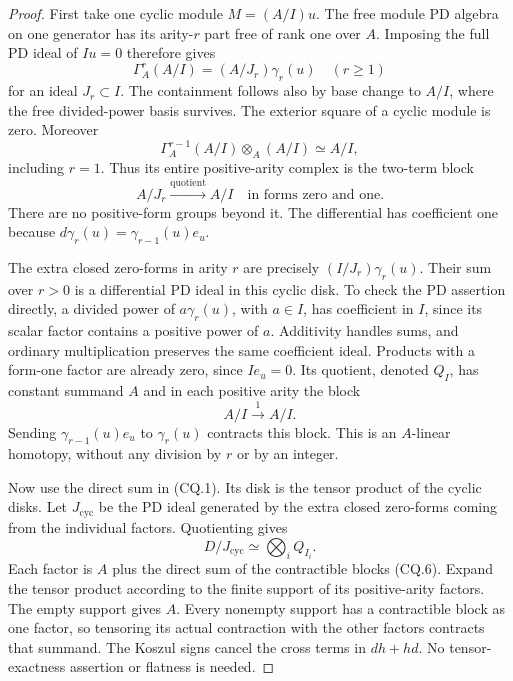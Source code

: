 \begin{proof}
First take one cyclic module \(M=(A/I)u\). The free module
PD algebra on one generator has its arity-\(r\) part free
of rank one over \(A\). Imposing the full PD ideal of
\(Iu=0\) therefore gives
\[
                 \Gamma_A^r(A/I)=(A/J_r)\gamma_r(u)
                    \quad(r\geq1)                     \tag{CQ.4}
\]
for an ideal \(J_r\subset I\). The containment follows
also by base change to \(A/I\), where the free divided-power
basis survives. The exterior square of a cyclic module is
zero. Moreover
\[
 \Gamma_A^{r-1}(A/I)\otimes_A(A/I)\simeq A/I,
\]
including \(r=1\). Thus its entire positive-arity complex
is the two-term block
\[
       A/J_r\xrightarrow{\mathrm{quotient}}A/I
          \quad\text{in forms zero and one}.            \tag{CQ.5}
\]
There are no positive-form groups beyond it. The differential
has coefficient one because
\(d\gamma_r(u)=\gamma_{r-1}(u)e_u\).

The extra closed zero-forms in arity \(r\) are precisely
\((I/J_r)\gamma_r(u)\). Their sum over \(r>0\) is a
differential PD ideal in this cyclic disk. To check the PD
assertion directly, a divided power of
\(a\gamma_r(u)\), with \(a\in I\), has coefficient
in \(I\), since its scalar factor contains a positive
power of \(a\). Additivity handles sums, and ordinary
multiplication preserves the same coefficient ideal. Products
with a form-one factor are already zero, since \(Ie_u=0\).
Its quotient, denoted \(Q_I\), has constant summand \(A\)
and in each positive arity the block
\[
                          A/I\xrightarrow{1}A/I.        \tag{CQ.6}
\]
Sending \(\gamma_{r-1}(u)e_u\) to \(\gamma_r(u)\)
contracts this block. This is an \(A\)-linear homotopy,
without any division by \(r\) or by an integer.

Now use the direct sum in (CQ.1). Its disk is the tensor
product of the cyclic disks. Let \(J_{\mathrm{cyc}}\)
be the PD ideal generated by the extra closed zero-forms
coming from the individual factors. Quotienting gives
\[
                    D/J_{\mathrm{cyc}}
                           \simeq\bigotimes_i Q_{I_i}.  \tag{CQ.7}
\]
Each factor is \(A\) plus the direct sum of the contractible
blocks (CQ.6). Expand the tensor product according to the
finite support of its positive-arity factors. The empty
support gives \(A\). Every nonempty support has a
contractible block as one factor, so tensoring its actual
contraction with the other factors contracts that summand.
The Koszul signs cancel the cross terms in \(dh+hd\).
No tensor-exactness assertion or flatness is needed.


\end{proof}
